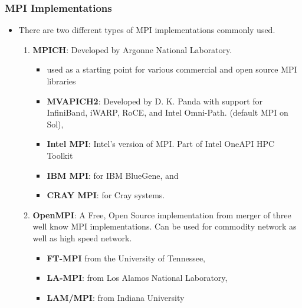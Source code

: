 \documentclass[10pt,t]{beamer}
\begin{document}
\begin{frame}
  \frametitle{MPI Implementations}
  \begin{itemize}
    \item There are two different types of MPI implementations commonly used. 
    \begin{enumerate}
       \item {\bf MPICH}: Developed by Argonne National Laboratory.
       \begin{itemize}
           \item used as a starting point for various commercial and open source MPI libraries
           \item {\bf MVAPICH2}: Developed by D. K. Panda with support for  InfiniBand, iWARP, RoCE, and Intel Omni-Path. (default MPI on Sol),
           \item {\bf Intel MPI}: Intel's version of MPI. Part of Intel OneAPI HPC Toolkit
           \item {\bf IBM MPI}:  for IBM BlueGene, and 
           \item {\bf CRAY MPI}: for Cray systems.
       \end{itemize}
       \item {\bf OpenMPI}: A Free, Open Source implementation from merger of three well know MPI implementations. Can be used for commodity network as well as high speed network.
       \begin{itemize}
           \item {\bf FT-MPI} from the University of Tennessee,
           \item {\bf LA-MPI}: from Los Alamos National Laboratory,
           \item {\bf LAM/MPI}: from Indiana University
       \end{itemize}
    \end{enumerate}
  \end{itemize}
\end{frame}
\end{document}
